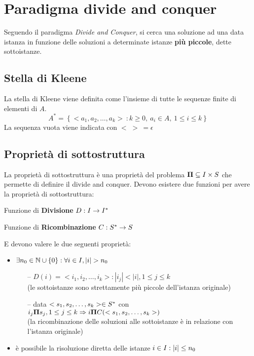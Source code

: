 \section{Paradigma divide and conquer}

Seguendo il paradigma \textit{Divide and Conquer}, si cerca una soluzione ad una data istanza in funzione delle soluzioni a determinate istanze \textbf{più piccole}, dette sottoistanze.

\subsection{Stella di Kleene}
\begin{definition}\label{def:kleene}
    La stella di Kleene viene definita come l'insieme di tutte le sequenze finite di elementi di $A$.
    $$ A^* = \left\{ < a_1, a_2, \dots, a_k > \: : k \geq 0, \: a_i \in A, \: 1 \leq i \leq k \right\}$$
    La sequenza vuota viene indicata con $ < \; > \: = \epsilon $
\end{definition}
\subsection{Proprietà di sottostruttura}

La proprietà di sottostruttura è una proprietà del problema $\bm{\Pi}{} \subseteq I{} \times S{} $ che permette di definire il divide and conquer. Devono esistere due funzioni per avere la proprietà di sottostruttura:

\begin{description}
    \item{Funzione di \textbf{Divisione}} $ D : I{} \to I{}^*$
    \item{Funzione di \textbf{Ricombinazione}} $ C : S{}^* \to S{}$
\end{description}

E devono valere le due seguenti proprietà:
\begin{itemize}
    \item $\exists n_0 \in \mathbb{N} \cup \{0\} : \forall i \in I{}, |i| > n_0 $
        \begin{itemize}
            \item[--] $ D(i)=<i_1, i_2, \dots, i_k>:|i_j|<|i|, 1 \leq j \leq k$ \\
                (le sottoistanze sono strettamente più piccole dell'istanza originale)
            \item[--] data $ <s_1, s_2, \dots, s_k> \in S{}^* $ con $i_j \bm{\Pi}{} s_j,  1 \leq j \leq k \Rightarrow i \bm{\Pi}{} C(<s_1, s_2, \dots, s_k>)$ \\
                (la ricombinazione delle soluzioni alle sottoistanze è in relazione con l'istanza originale)
        \end{itemize}
    \item è possibile la risoluzione diretta delle istanze $ i \in I{} : |i| \leq n_0 $
\end{itemize}

